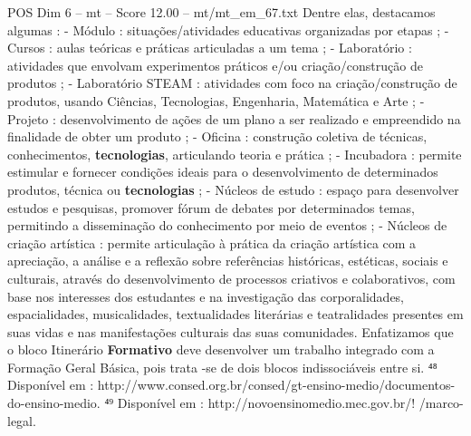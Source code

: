 \begin{textsample}{POS Dim 6 – mt – Score 12.00 – mt/mt\_em\_67.txt}
Dentre elas, destacamos algumas : - Módulo : situações/atividades educativas organizadas por etapas ; - Cursos : aulas teóricas e práticas articuladas a um tema ; - Laboratório : atividades que envolvam experimentos práticos e/ou criação/construção de produtos ; - Laboratório STEAM : atividades com foco na criação/construção de produtos, usando Ciências, Tecnologias, Engenharia, Matemática e Arte ; - Projeto : desenvolvimento de ações de um plano a ser realizado e empreendido na finalidade de obter um produto ; - Oficina : construção coletiva de técnicas, conhecimentos, \textbf{tecnologias}, articulando teoria e prática ; - Incubadora : permite estimular e fornecer condições ideais para o desenvolvimento de determinados produtos, técnica ou \textbf{tecnologias} ; - Núcleos de estudo : espaço para desenvolver estudos e pesquisas, promover fórum de debates por determinados temas, permitindo a disseminação do conhecimento por meio de eventos ; - Núcleos de criação artística : permite articulação à prática da criação artística com a apreciação, a análise e a reflexão sobre referências históricas, estéticas, sociais e culturais, através do desenvolvimento de processos criativos e colaborativos, com base nos interesses dos estudantes e na investigação das corporalidades, espacialidades, musicalidades, textualidades literárias e teatralidades presentes em suas vidas e nas manifestações culturais das suas comunidades.
Enfatizamos que o bloco Itinerário \textbf{Formativo} deve desenvolver um trabalho integrado com a Formação Geral Básica, pois trata -se de dois blocos indissociáveis entre si. ⁴⁸ Disponível em : http://www.consed.org.br/consed/gt-ensino-medio/documentos-do-ensino-medio. ⁴⁹ Disponível em : http://novoensinomedio.mec.gov.br/! /marco-legal.

\end{textsample}
